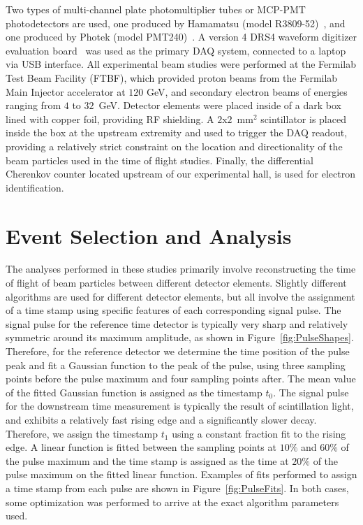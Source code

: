 \documentclass[12pt]{article}
\begin{document}
Two types of multi-channel plate photomultiplier
tubes or MCP-PMT photodetectors 
are used, one produced by Hamamatsu 
(model R3809-52)~\cite{HamamatsuMCP3809}, and one
produced by Photek (model PMT240)~\cite{Photek240}. 
A version 4 DRS4 waveform digitizer evaluation board~\cite{DRS4} was
used as the primary DAQ system, connected to a laptop via
USB interface. All experimental beam studies were performed
at the Fermilab Test Beam Facility (FTBF), which 
provided proton beams from the Fermilab Main Injector accelerator
at $120$ GeV, and secondary electron beams of energies ranging 
from $4$ to $32$~GeV. Detector elements were placed inside of a 
dark box lined with copper foil, providing RF shielding. A
$2$x$2$~$\mathrm{mm}^{2}$ scintillator is placed inside the box at
the upstream extremity and used to trigger the DAQ readout,
providing a relatively strict constraint on the location and directionality
of the beam particles used in the time of flight studies. 
Finally, the differential Cherenkov counter located upstream
of our experimental hall, is used for electron identification. 

\section{Event Selection and Analysis}

The analyses performed in these studies primarily involve
reconstructing the time of flight of beam particles
between different detector elements. Slightly different
algorithms are used for different detector elements,
but all involve the assignment of a time stamp using 
specific features of each corresponding signal pulse.
The signal pulse for the reference time detector
is typically very sharp and relatively symmetric 
around its maximum amplitude, as shown in 
Figure~\ref{fig:PulseShapes}. Therefore, for the reference 
detector we determine the time position of the pulse
peak and fit a Gaussian function to the peak
of the pulse, using three sampling points before the 
pulse maximum and four sampling points after. The
mean value of the fitted Gaussian function is
assigned as the timestamp $t_{0}$. The signal pulse
for the downstream time measurement is typically
the result of scintillation light, and exhibits a 
relatively fast rising edge and a significantly slower
decay. Therefore, we assign the timestamp $t_{1}$ 
using a constant fraction fit to the rising edge.
A linear function is fitted between the sampling
points at $10\%$ and $60\%$ of the pulse maximum
and the time stamp is assigned as the time 
at $20\%$ of the pulse maximum on the fitted
linear function. Examples of fits performed to assign a 
time stamp from each pulse are shown in Figure~\ref{fig:PulseFits}.
In both cases, some optimization was performed 
to arrive at the exact algorithm parameters used.
\end{document}

